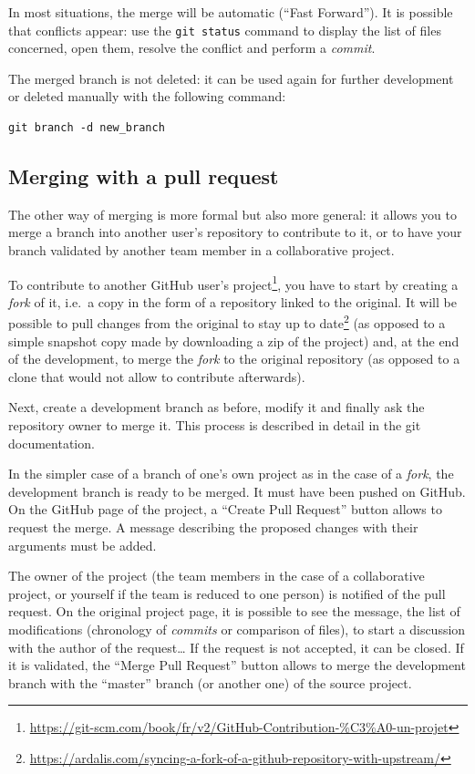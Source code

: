 \documentclass[
  12pt,
  american,
  a4paper,
  extrafontsizes,onecolumn,openright
  ]{memoir}
\newlength{\rf}
\begin{document}
In most situations, the merge will be automatic (\enquote{Fast Forward}).
It is possible that conflicts appear: use the \texttt{git\ status} command to display the list of files concerned, open them, resolve the conflict and perform a \emph{commit}.

The merged branch is not deleted: it can be used again for further development or deleted manually with the following command:

\begin{verbatim}
git branch -d new_branch
\end{verbatim}

\subsection{Merging with a pull request}\label{merging-with-a-pull-request}

The other way of merging is more formal but also more general: it allows you to merge a branch into another user's repository to contribute to it, or to have your branch validated by another team member in a collaborative project.

To contribute to another GitHub user's project\footnote{\url{https://git-scm.com/book/fr/v2/GitHub-Contribution-\%C3\%A0-un-projet}}, you have to start by creating a \emph{fork} of it, i.e.~a copy in the form of a repository linked to the original.
It will be possible to pull changes from the original to stay up to date\footnote{\url{https://ardalis.com/syncing-a-fork-of-a-github-repository-with-upstream/}} (as opposed to a simple snapshot copy made by downloading a zip of the project) and, at the end of the development, to merge the \emph{fork} to the original repository (as opposed to a clone that would not allow to contribute afterwards).

Next, create a development branch as before, modify it and finally ask the repository owner to merge it.
This process is described in detail in the git documentation.

In the simpler case of a branch of one's own project as in the case of a \emph{fork}, the development branch is ready to be merged.
It must have been pushed on GitHub.
On the GitHub page of the project, a \enquote{Create Pull Request} button allows to request the merge.
A message describing the proposed changes with their arguments must be added.

The owner of the project (the team members in the case of a collaborative project, or yourself if the team is reduced to one person) is notified of the pull request.
On the original project page, it is possible to see the message, the list of modifications (chronology of \emph{commits} or comparison of files), to start a discussion with the author of the request\ldots{}
If the request is not accepted, it can be closed.
If it is validated, the \enquote{Merge Pull Request} button allows to merge the development branch with the \enquote{master} branch (or another one) of the source project.
\end{document}
